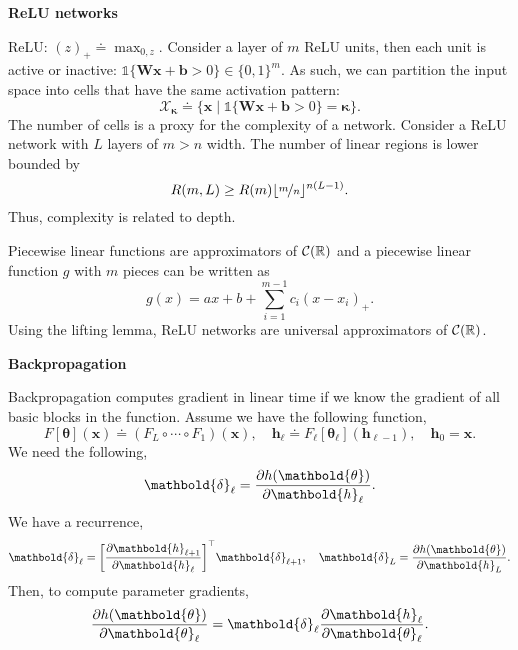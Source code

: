 \documentclass[10pt]{article}
\newenvironment{topic}[1]
{\textbf{\sffamily \footnotesize \colorbox{black}{\rlap{\textbf{\textcolor{white}{#1}}}\hspace{\linewidth}\hspace{-2\fboxsep}}}}
{}
\newenvironment{subtopic}[1]
{\vspace{0.1cm} \begin{center}\textbf{\footnotesize \sffamily #1}\end{center}}
{}
\renewcommand{\mat}[1]{\ensuremath{\mathbf{#1}}}
\renewcommand{\vec}[1]{\ensuremath{\mathbold{#1}}}
\begin{document}
\begin{multicols*}{3}
\begin{topic}{Feedforward networks}
        \begin{subtopic}{ReLU networks}
            ReLU: $(z)_+ \doteq \max_{0,z}$. Consider a layer of $m$ ReLU units, then each unit is
            active or inactive: $\mathbb{1}\{ \mat{W}\vec{x} + \vec{b} > 0 \} \in \{ 0,1 \}^m$. As
            such, we can partition the input space into cells that have the same activation pattern: \[
                \mathcal{X}_{\vec{\kappa}} \doteq \{ \vec{x} \mid \mathbb{1}\{ \mat{W}\vec{x} + \vec{b} > 0 \} = \vec{\kappa} \}.
            \]
            The number of cells is a proxy for the complexity of a network. Consider a ReLU network with $L$
            layers of $m > n$ width. The number of linear regions is lower bounded by \[
                R(m,L) \geq R(m) \lfloor \nicefrac{m}{n} \rfloor^{n(L-1)}.
            \]
            Thus, complexity is related to depth.

            Piecewise linear functions are approximators of $\mathcal{C}(\mathbb{R})$ and a piecewise linear function
            $g$ with $m$ pieces can be written as \[
                g(x) = ax + b + \sum_{i=1}^{m-1} c_i(x - x_i)_+.
            \]
            Using the lifting lemma, ReLU networks are universal approximators of $\mathcal{C}(\mathbb{R})$.
        \end{subtopic}

    \end{topic}

    \begin{topic}{Gradient-based learning}

        \begin{subtopic}{Backpropagation}
            Backpropagation computes gradient in linear time if we know the gradient of all basic
            blocks in the function. Assume we have the following function, \[
                F[\vec{\theta}](\vec{x}) \doteq (F_L \circ \cdots \circ F_1)(\vec{x}), \quad \vec{h}_{\ell} \doteq F_{\ell}[\vec{\theta}_{\ell}](\vec{h}_{\ell-1}), \quad \vec{h}_0 = \vec{x}.
            \]
            We need the following, \[
                \vec{\delta}_{\ell} = \pdv{h(\vec{\theta})}{\vec{h}_{\ell}}.
            \]
            We have a recurrence, \[
                \vec{\delta}_{\ell} = \transpose{\lft[ \pdv{\vec{h}_{\ell+1}}{\vec{h}_{\ell}} \rgt]} \vec{\delta}_{\ell+1}, \quad \vec{\delta}_L = \pdv{h(\vec{\theta})}{\vec{h}_L}.
            \]
            Then, to compute parameter gradients, \[
                \pdv{h(\vec{\theta})}{\vec{\theta}_{\ell}} = \vec{\delta}_{\ell} \pdv{\vec{h}_{\ell}}{\vec{\theta}_{\ell}}.
            \]
        \end{subtopic}


\end{topic}
\end{multicols*}
\end{document}
